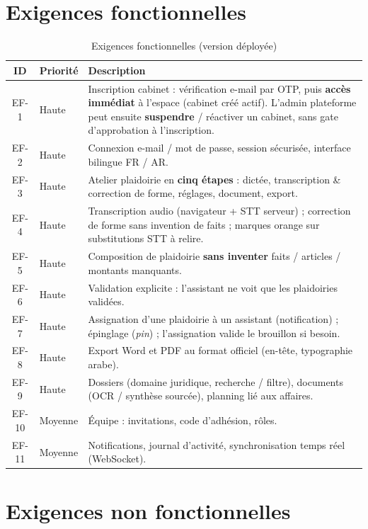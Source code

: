 \section{Exigences fonctionnelles}

\begin{table}[H]
\centering
\caption{Exigences fonctionnelles (version déployée)}
\label{tab:ef}
\small
\renewcommand{\arraystretch}{1.25}
\begin{tabular}{@{}clp{9.6cm}@{}}
\toprule
\textbf{ID} & \textbf{Priorité} & \textbf{Description} \\
\midrule
EF-1 & Haute & Inscription cabinet : vérification e-mail par OTP, puis \textbf{accès immédiat} à l'espace (cabinet créé actif). L'admin plateforme peut ensuite \textbf{suspendre} / réactiver un cabinet, sans gate d'approbation à l'inscription. \\
EF-2 & Haute & Connexion e-mail / mot de passe, session sécurisée, interface bilingue FR / AR. \\
EF-3 & Haute & Atelier plaidoirie en \textbf{cinq étapes} : dictée, transcription \& correction de forme, réglages, document, export. \\
EF-4 & Haute & Transcription audio (navigateur + STT serveur) ; correction de forme sans invention de faits ; marques orange sur substitutions STT à relire. \\
EF-5 & Haute & Composition de plaidoirie \textbf{sans inventer} faits / articles / montants manquants. \\
EF-6 & Haute & Validation explicite : l'assistant ne voit que les plaidoiries validées. \\
EF-7 & Haute & Assignation d'une plaidoirie à un assistant (notification) ; épinglage (\textit{pin}) ; l'assignation valide le brouillon si besoin. \\
EF-8 & Haute & Export Word et PDF au format officiel (en-tête, typographie arabe). \\
EF-9 & Haute & Dossiers (domaine juridique, recherche / filtre), documents (OCR / synthèse sourcée), planning lié aux affaires. \\
EF-10 & Moyenne & Équipe : invitations, code d'adhésion, rôles. \\
EF-11 & Moyenne & Notifications, journal d'activité, synchronisation temps réel (WebSocket). \\
\bottomrule
\end{tabular}
\end{table}

\section{Exigences non fonctionnelles}

